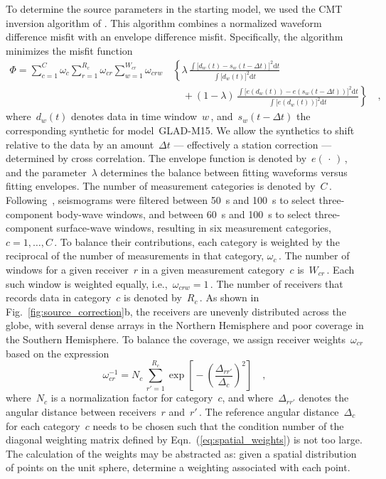 \documentclass[extra,mreferee]{gji}
\begin{document}
To determine the source parameters in the starting model,
we used the CMT inversion algorithm of \cite{liu2004spectral}.
This algorithm combines a normalized waveform difference misfit with an envelope difference misfit.
Specifically, the algorithm minimizes the misfit function
\begin{equation}
   \begin{split}
      \Phi =  \sum\limits_{c=1}^{C} \omega_c \sum\limits_{r=1}^{R_c} \omega_{cr}
       \sum\limits_{w=1}^{W_{cr}} \omega_{crw}\,
          & \left\{ \lambda\, \frac
              { \int \big[ d_w(t) - s_w(t - \Delta t) \big]^2 \mathrm{d}t}
              {\int \big[ d_w(t) \big]^2  \mathrm{d}t} \right.
       \\ & \quad \left. \mbox{} + (1 - \lambda)\, \frac
              {\int \big[ e(d_w(t)) - e(s_w(t - \Delta t)) \big]^2 \mathrm{d}t}
              {\int \big[ e(d_w(t)) \big]^2\mathrm{d}t} \right\}
              \quad ,
   \end{split}
\end{equation}
where~$d_w(t)$ denotes data in time window~$w$\,,
and~$s_w(t - \Delta t)$ the corresponding synthetic for model~GLAD-M15.
We allow the synthetics to shift relative to the data by an amount~$\Delta t$
--- effectively a station correction --- determined by cross correlation.
The envelope function is denoted by~$e(\,\cdot\,)$\,,
and the parameter~$\lambda$ determines the balance between fitting waveforms versus fitting envelopes.
The number of measurement categories is denoted by~$C$\,.
Following~\cite{ekstrom2012global},
seismograms were filtered between 50~s and 100~s
to select three-component body-wave windows,
and between 60~s and 100~s to select three-component
surface-wave windows,
resulting in six measurement categories, $c=1,\ldots,C$\,.
To balance their contributions,
each category is weighted by the reciprocal of the number of measurements in that
category, $\omega_c$\,.
The number of windows for a given receiver~$r$ in a given measurement category~$c$ is~$W_{cr}$\,.
Each such window is weighted equally, i.e.,~$\omega_{crw}=1$\,.
The number of receivers that records data in category~$c$ is denoted by~$R_c$\,.
As shown in Fig.~\ref{fig:source_correction}b,
the receivers are unevenly distributed across the globe,
with several dense arrays in the Northern Hemisphere and poor coverage in the Southern Hemisphere.
To balance the coverage,
we assign receiver weights~$\omega_{cr}$ based on the expression
\begin{equation}
\omega_{cr}^{-1} = N_c\,\sum_{r'=1}^{R_c} \exp\left[\mbox{}-\left(\frac{\Delta_{rr'}}{\Delta_c}\right)^2\right]
\quad ,
\label{eq:spatial_weights}
\end{equation}
where~$N_c$ is a normalization factor for category~$c$,
and where~$\Delta_{rr'}$ denotes the angular distance between receivers~$r$ and~$r'$\,.
The reference angular distance~$\Delta_c$ for each category~$c$ needs to be chosen such that the condition 
number of the diagonal weighting matrix defined by Eqn.~(\ref{eq:spatial_weights}) is not too large.
The calculation of the weights may be abstracted as: given a spatial distribution of
points on the unit sphere, determine a weighting associated with each point.
\end{document}
